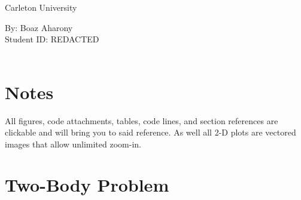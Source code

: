 \documentclass[hidelinks, 12pt]{article}%
\begin{document}
    \setcounter{page}{0}
    \begin{center}
        \vspace*{1cm}
        {\fontsize{300}{50}\selectfont {\bfseries AERO 3240 Term Assignment\\}}
        \vspace{3cm}
        {\LARGE Carleton University \\}
        \vspace{8cm}
    \end{center}
    \begin{center}
        By: 
        Boaz Aharony\\ \vspace{10pt}
        Student ID: 
        REDACTED\\ \vspace{10pt}
        \\
    \end{center}
    \thispagestyle{empty}

    \clearpage

    \section*{Notes}
    All figures, code attachments, tables, code lines, and section references are clickable and will bring you to said reference. As well all 2-D plots are vectored images that allow unlimited zoom-in.
    
    \tableofcontents
    
    \clearpage
    
    \listoffigures
    \listoftables
    \lstlistoflistings
    
    \clearpage
    


\setcounter{section}{1}
    \section{Two-Body Problem}
    
    \setcounter{subsection}{4}
\end{document}
